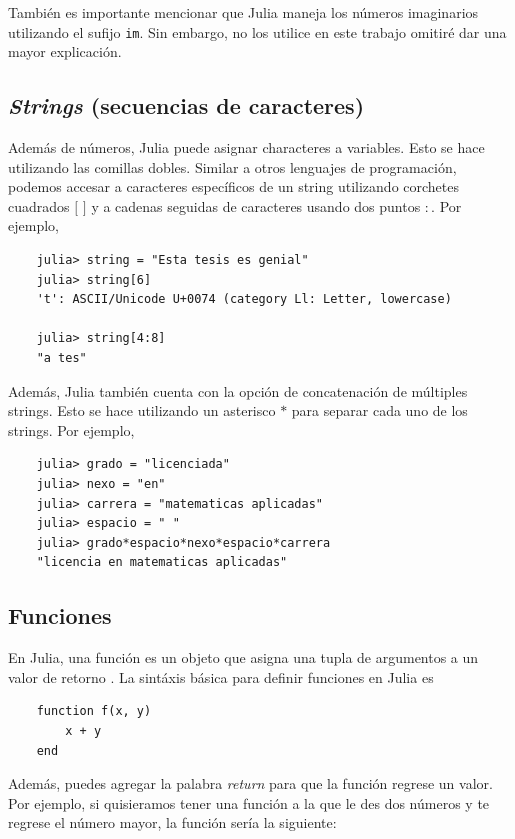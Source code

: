 También es importante mencionar que Julia maneja los números imaginarios utilizando el sufijo \texttt{im}. Sin embargo, no los utilice en este trabajo omitiré dar una mayor explicación. 

\subsection{\textit{Strings} (secuencias de caracteres)} 

Además de números, Julia puede asignar characteres a variables. Esto se hace utilizando las comillas dobles. Similar a otros lenguajes de programación, podemos accesar a caracteres específicos de un string utilizando corchetes cuadrados $[$ $]$ y a cadenas seguidas de caracteres usando dos puntos $:$. Por ejemplo,

\begin{verbatim}
    julia> string = "Esta tesis es genial"
    julia> string[6]
    't': ASCII/Unicode U+0074 (category Ll: Letter, lowercase)
    
    julia> string[4:8]
    "a tes"
\end{verbatim}


Además, Julia también cuenta con la opción de concatenación de múltiples strings. Esto se hace utilizando un asterisco $*$ para separar cada uno de los strings. Por ejemplo,

\begin{verbatim}
	julia> grado = "licenciada"
	julia> nexo = "en"
	julia> carrera = "matematicas aplicadas"
	julia> espacio = " "
	julia> grado*espacio*nexo*espacio*carrera
	"licencia en matematicas aplicadas"
\end{verbatim}

\subsection{Funciones}
En Julia, una función es un objeto que asigna una tupla de argumentos a un valor de retorno \citep{Julia_manual}. La sintáxis básica para definir funciones en Julia es 

\begin{verbatim}
	function f(x, y)
		x + y
	end
\end{verbatim}

Además, puedes agregar la palabra \textit{return} para que la función regrese un valor. Por ejemplo, si quisieramos tener una función a la que le des dos números y te regrese el número mayor, la función sería la siguiente:


